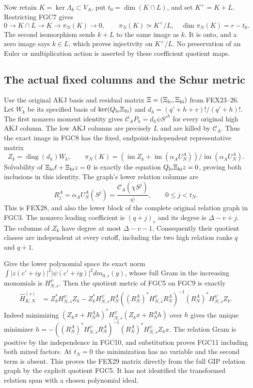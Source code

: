 \documentclass[11pt,a4paper]{article}
\begin{document}
Now retain $K=\ker\Lambda_k\subset V_A$, put
$t_0=\dim(K\cap L)$, and set $K^+=K+L$. Restricting FGC7 gives
\[
 0\longrightarrow K\cap L\longrightarrow K
       \longrightarrow\pi_N(K)\longrightarrow0,
 \qquad \pi_N(K)\simeq K^+/L,
 \quad \dim\pi_N(K)=r-t_0.
 \tag{FGC8}
\]
The second isomorphism sends $k+L$ to the same image as $k$.
It is onto, and a zero image says $k\in L$, which proves injectivity
on $K^+/L$. No preservation of an Euler or multiplication action is
asserted by these coefficient quotient maps.

\subsection{The actual fixed columns and the Schur metric}

Use the original AKJ basis and residual matrix
$\Xi=(\Xi_{\rm lo},\Xi_{\rm hi})$ from FEX23--26. Let $W_k$
be its specified basis of $\ker(Q_{\rm lo}\Xi_{\rm hi})$ and
$d_h=(q'+h+v)!/(q'+h)!$. The first nonzero moment identity gives
$\mathcal C_AP_h=d_h\psi S'^h$ for every original high AKJ column.
The low AKJ columns are precisely $L$ and are killed by $\mathcal C_A$.
Thus the exact image in FGC8 has the fixed, endpoint-independent
representative matrix
\[
 Z_k=\operatorname{diag}(d_h)W_k,
 \qquad \pi_N(K)=
   (\operatorname{im}Z_k+\operatorname{im}(\alpha_AU_N^A))
                         /\operatorname{im}(\alpha_AU_N^A).
 \tag{FGC9}
\]
Solvability of $\Xi_{\rm lo}\ell+\Xi_{\rm hi}z=0$ is exactly
the equation $Q_{\rm lo}\Xi_{\rm hi}z=0$, proving both inclusions
in this identity. The graph's lower relation columns are
\[
 R_j^A=\alpha_AU_N^A(S^j)=
 \frac{\mathcal C_A(\chi S^j)}{\psi},\qquad0\le j<t_N.
 \tag{FGC10}
\]
This is FEX28, and also the lower block of the complete original
relation graph in FGC3. The nonzero leading coefficient is
$(q+j)_v$ and its degree is $\Delta-v+j$. The columns of $Z_k$
have degree at most $\Delta-v-1$. Consequently their quotient
classes are independent at every cutoff, including the two high
relation ranks $q$ and $q+1$.

Give the lower polynomial space its exact norm
$\int|z(c'+iy)|^2|\psi(c'+iy)|^2dm_{0,s}(y)$, whose full Gram
in the increasing monomials is $H_{N,s}^\psi$. Then the quotient
metric of FGC5 on FGC9 is exactly
\[
 \begin{split}
 \widehat H_{K,N}^{(s)}
 &=Z_k^*H_{N,s}^\psi Z_k
 -Z_k^*H_{N,s}^\psi R_N^A
   ((R_N^A)^*H_{N,s}^\psi R_N^A)^{-1}
                  (R_N^A)^*H_{N,s}^\psi Z_k.
 \end{split}
 \tag{FGC11}
\]
Indeed minimizing $(Z_kx+R_N^Ah)^*H_{N,s}^\psi(Z_kx+R_N^Ah)$
over $h$ gives the unique minimizer
$h=-((R_N^A)^*H_{N,s}^\psi R_N^A)^{-1}(R_N^A)^*H_{N,s}^\psi Z_kx$.
The relation Gram is positive by the independence in FGC10, and
substitution proves FGC11 including both mixed factors. At $t_N=0$
the minimization has no variable and the second term is absent.
This proves the FEX29 matrix directly from the full GIP relation
graph by the explicit quotient FGC5. It has not identified the
transformed relation span with a chosen polynomial ideal.
\end{document}
